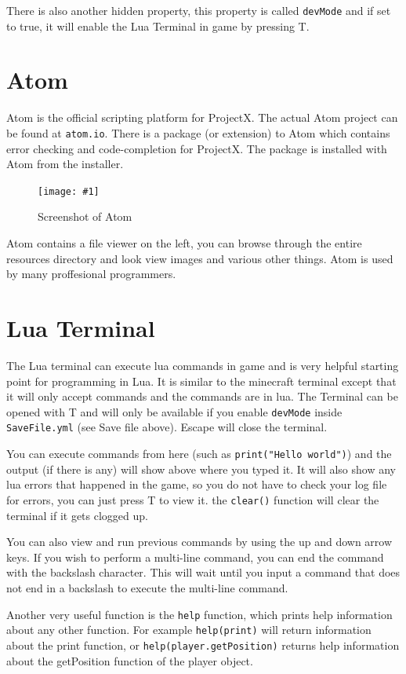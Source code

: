 \documentclass{book}
\newcommand{\fFigure}[2]
	{\begin{figure}[ht!]
		\centering
		\texttt{[image: \#1]}
		\caption{#2}
	\end{figure}}
\begin{document}
	There is also another hidden property, this property is called \texttt{devMode} and if set to true, it will enable the Lua Terminal in game by pressing T.
	\section{Atom}
	Atom is the official scripting platform for ProjectX. The actual Atom project can be found at \texttt{atom.io}. There is a package (or extension) to Atom which contains error checking and code-completion for ProjectX. The package is installed with Atom from the installer.
	
	\fFigure{Atom.png}{Screenshot of Atom}

	Atom contains a file viewer on the left, you can browse through the entire resources directory and look view images and various other things. Atom is used by many proffesional programmers.

	\section{Lua Terminal}
	The Lua terminal can execute lua commands in game and is very helpful starting point for programming in Lua. It is similar to the minecraft terminal except that it will only accept commands and the commands are in lua. The Terminal can be opened with T and will only be available if you enable \texttt{devMode} inside \texttt{SaveFile.yml} (see Save file above). Escape will close the terminal.

	You can execute commands from here (such as \texttt{print("Hello world")}) and the output (if there is any) will show above where you typed it. It will also show any lua errors that happened in the game, so you do not have to check your log file for errors, you can just press T to view it. the \texttt{clear()} function will clear the terminal if it gets clogged up.
	
	You can also view and run previous commands by using the up and down arrow keys. If you wish to perform a multi-line command, you can end the command with the backslash character. This will wait until you input a command that does not end in a backslash to execute the multi-line command.
	
	Another very useful function is the \texttt{help} function, which prints help information about any other function. For example \texttt{help(print)} will return information about the print function, or \texttt{help(player.getPosition)} returns help information about the getPosition function of the player object.
\end{document}
